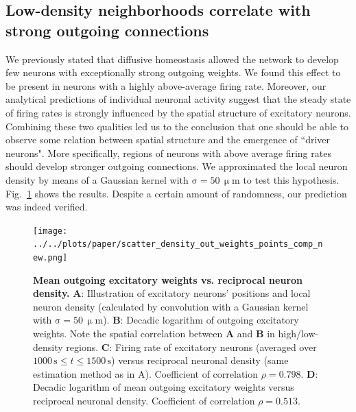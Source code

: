\documentclass[10pt,letterpaper]{article}
\begin{document}
\subsection*{Low-density neighborhoods correlate with strong outgoing connections}
We previously stated that diffusive homeostasis allowed the network to develop few neurons with exceptionally strong outgoing weights. We found this effect to be present in neurons with a highly above-average firing rate. Moreover, our analytical predictions of individual neuronal activity suggest that the steady state of firing rates is strongly influenced by the spatial structure of excitatory neurons. Combining these two qualities led us to the conclusion that one should be able to observe some relation between spatial structure and the emergence of ``driver neurons". More specifically, regions of neurons with above average firing rates should develop stronger outgoing connections. We approximated the local neuron density by means of a Gaussian kernel with $\mathrm{\sigma = 50\, \upmu m}$ to test this hypothesis. Fig.~\ref{Inverse_Dens_vs_Sum_Out_Weights} shows the results. Despite a certain amount of randomness, our prediction was indeed verified. 
\begin{figure}
\texttt{[image: ../../plots/paper/scatter\_density\_out\_weights\_points\_comp\_new.png]}
\caption{{\bf Mean outgoing excitatory weights vs. reciprocal neuron density.} \textbf{A}: Illustration of excitatory neurons' positions and local neuron density (calculated by convolution with a Gaussian kernel with $\mathrm{\sigma = 50\, \upmu m}$). \textbf{B}: Decadic logarithm of outgoing excitatory weights. Note the spatial correlation between \textbf{A} and \textbf{B} in high/low-density regions. \textbf{C}: Firing rate of excitatory neurons (averaged over $\mathrm{ 1000\,s} \leq t \mathrm{\leq 1500\,s}$) versus reciprocal neuronal density (same estimation method as in A). Coefficient of correlation $\rho = 0.798$. \textbf{D}: Decadic logarithm of mean outgoing excitatory weights versus reciprocal neuronal density. Coefficient of correlation $\rho = 0.513$.}
\label{Inverse_Dens_vs_Sum_Out_Weights}
\end{figure}


\newpage
\end{document}
